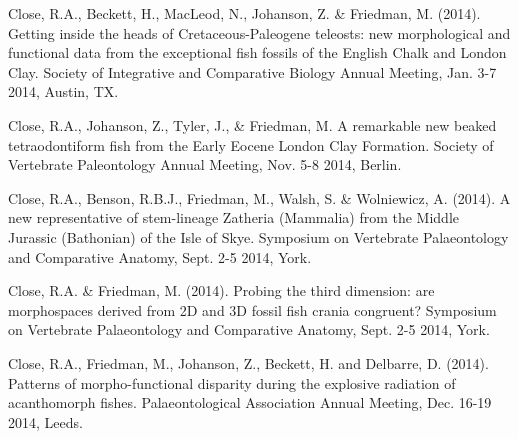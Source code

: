 \documentclass[a4paper, oneside, final]{scrartcl} %
\begin{document}
\begin{center}
\begin{flushleft}
\vspace{6pt}

Close, R.A., Beckett, H., MacLeod, N., Johanson, Z. \& Friedman, M. (2014). Getting inside the heads of Cretaceous-Paleogene teleosts: new morphological and functional data from the exceptional fish fossils of the English Chalk and London Clay. Society of Integrative and Comparative Biology Annual Meeting, Jan. 3-7 2014, Austin, TX.\\

\vspace{6pt}

Close, R.A., Johanson, Z., Tyler, J., \& Friedman, M. A remarkable new beaked tetraodontiform fish from the Early Eocene London Clay Formation. Society of Vertebrate Paleontology Annual Meeting, Nov. 5-8 2014, Berlin.\\

\vspace{6pt}

Close, R.A., Benson, R.B.J., Friedman, M., Walsh, S. \& Wolniewicz, A. (2014). A new representative of stem-lineage Zatheria (Mammalia) from the Middle Jurassic (Bathonian) of the Isle of Skye. Symposium on Vertebrate Palaeontology and Comparative Anatomy, Sept. 2-5 2014, York.\\

\vspace{6pt}

Close, R.A. \& Friedman, M. (2014). Probing the third dimension: are morphospaces derived from 2D and 3D fossil fish crania congruent? Symposium on Vertebrate Palaeontology and Comparative Anatomy, Sept. 2-5 2014, York.\\

\vspace{6pt}

Close, R.A., Friedman, M., Johanson, Z., Beckett, H. and Delbarre, D. (2014). Patterns of morpho-functional disparity during the explosive radiation of acanthomorph fishes. Palaeontological Association Annual Meeting, Dec. 16-19 2014, Leeds.\\

\end{flushleft}



\end{center}
\end{document}
